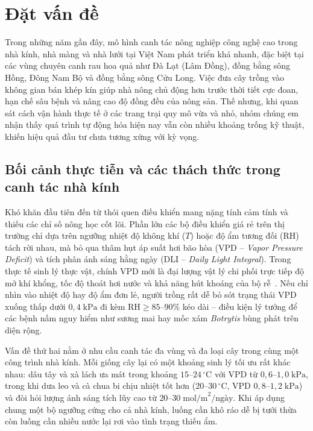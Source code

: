 \chapter{Đặt vấn đề}
\label{chap:problem-statement}

Trong những năm gần đây, mô hình canh tác nông nghiệp công nghệ cao trong nhà kính, nhà màng và nhà lưới tại Việt Nam phát triển khá nhanh, đặc biệt tại các vùng chuyên canh rau hoa quả như Đà Lạt (Lâm Đồng), đồng bằng sông Hồng, Đông Nam Bộ và đồng bằng sông Cửu Long. Việc đưa cây trồng vào không gian bán khép kín giúp nhà nông chủ động hơn trước thời tiết cực đoan, hạn chế sâu bệnh và nâng cao độ đồng đều của nông sản. Thế nhưng, khi quan sát cách vận hành thực tế ở các trang trại quy mô vừa và nhỏ, nhóm chúng em nhận thấy quá trình tự động hóa hiện nay vẫn còn nhiều khoảng trống kỹ thuật, khiến hiệu quả đầu tư chưa tương xứng với kỳ vọng.

\section{Bối cảnh thực tiễn và các thách thức trong canh tác nhà kính}
\label{sec:c1-context}

Khó khăn đầu tiên đến từ thói quen điều khiển mang nặng tính cảm tính và thiếu các chỉ số nông học cốt lõi. Phần lớn các bộ điều khiển giá rẻ trên thị trường chỉ dựa trên ngưỡng nhiệt độ không khí (\(T\)) hoặc độ ẩm tương đối (\(\text{RH}\)) tách rời nhau, mà bỏ qua thâm hụt áp suất hơi bão hòa (VPD -- \textit{Vapor Pressure Deficit}) và tích phân ánh sáng hằng ngày (DLI -- \textit{Daily Light Integral}). Trong thực tế sinh lý thực vật, chính VPD mới là đại lượng vật lý chi phối trực tiếp độ mở khí khổng, tốc độ thoát hơi nước và khả năng hút khoáng của bộ rễ~\cite{monteithVpd}. Nếu chỉ nhìn vào nhiệt độ hay độ ẩm đơn lẻ, người trồng rất dễ bỏ sót trạng thái VPD xuống thấp dưới \(0{,}4\;\text{kPa}\) đi kèm \(\text{RH} \ge 85\text{--}90\%\) kéo dài -- điều kiện lý tưởng để các bệnh nấm nguy hiểm như sương mai hay mốc xám \textit{Botrytis} bùng phát trên diện rộng.

Vấn đề thứ hai nằm ở nhu cầu canh tác đa vùng và đa loại cây trong cùng một công trình nhà kính. Mỗi giống cây lại có một khoảng sinh lý tối ưu rất khác nhau: dâu tây và xà lách ưa mát trong khoảng \(15\text{--}24\,^\circ\text{C}\) với VPD từ \(0{,}6\text{--}1{,}0\;\text{kPa}\), trong khi dưa leo và cà chua bi chịu nhiệt tốt hơn (\(20\text{--}30\,^\circ\text{C}\), VPD \(0{,}8\text{--}1{,}2\;\text{kPa}\)) và đòi hỏi lượng ánh sáng tích lũy cao từ \(20\text{--}30\;\text{mol/m}^2/\text{ngày}\). Khi áp dụng chung một bộ ngưỡng cứng cho cả nhà kính, luống cần khô ráo dễ bị tưới thừa còn luống cần nhiều nước lại rơi vào tình trạng thiếu ẩm.

